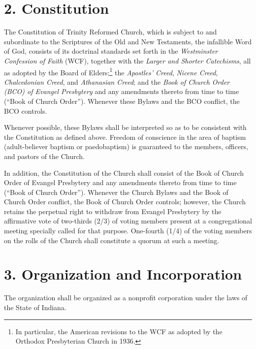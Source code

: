 \documentclass[
]{book}
\begin{document}
\hypertarget{constitution}{%
\section*{2. Constitution}\label{constitution}}

The Constitution of Trinity Reformed Church, which is subject to and subordinate to the Scriptures of the Old and New Testaments, the infallible Word of God, consists of its doctrinal standards set forth in the \emph{Westminster Confession of Faith} (WCF), together with the \emph{Larger and Shorter Catechisms}, all as adopted by the Board of Elders;\footnote{In particular, the American revisions to the WCF as adopted by the Orthodox Presbyterian Church in 1936.} the \emph{Apostles' Creed}, \emph{Nicene Creed}, \emph{Chalcedonian Creed}, and \emph{Athanasian Creed}; and the \emph{Book of Church Order (BCO) of Evangel Presbytery} and any amendments thereto from time to time (``Book of Church Order''). Whenever these Bylaws and the BCO conflict, the BCO controls.

Whenever possible, these Bylaws shall be interpreted so as to be consistent with the Constitution as defined above. Freedom of conscience in the area of baptism (adult-believer baptism or paedobaptism) is guaranteed to the members, officers, and pastors of the Church.

In addition, the Constitution of the Church shall consist of the Book of Church Order of Evangel Presbytery and any amendments thereto from time to time (``Book of Church Order''). Whenever the Church Bylaws and the Book of Church Order conflict, the Book of Church Order controls; however, the Church retains the perpetual right to withdraw from Evangel Presbytery by the affirmative vote of two-thirds (2/3) of voting members present at a congregational meeting specially called for that purpose. One-fourth (1/4) of the voting members on the rolls of the Church shall constitute a quorum at such a meeting.

\hypertarget{organization-and-incorporation}{%
\section*{3. Organization and Incorporation}\label{organization-and-incorporation}}

The organization shall be organized as a nonprofit corporation under the laws of the State of Indiana.
\end{document}

